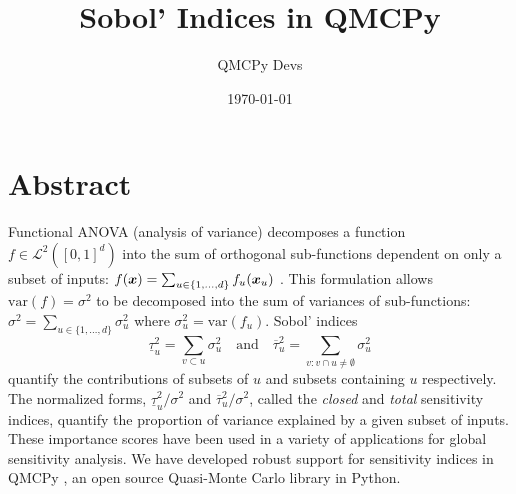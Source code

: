\documentclass{article}
\title{Sobol' Indices in QMCPy}
\author{QMCPy Devs}
\date{\today}
\begin{document}
\maketitle

\section{Abstract}
Functional ANOVA (analysis of variance) decomposes a function $f \in \mathcal{L}^2([0,1]^d)$ into the sum of orthogonal sub-functions dependent on only a subset of inputs: $f(\boldsymbol{x}) = \sum_{u \in \{1,\dots,d\}} f_u(\boldsymbol{x}_u)$ \cite[Appendix A]{mcbook}. This formulation allows $\text{var}(f)=\sigma^2$ to be decomposed into the sum of variances of sub-functions: 
$\sigma^2 = \sum_{u \in \{1,\dots,d\}} \sigma^2_u$ where $\sigma^2_u = \text{var}(f_u)$. Sobol' indices 
$$\underline{\tau}_u^2 = \sum_{v \subset u} \sigma^2_u \quad \text{and} \quad  \overline{\tau}_u^2 = \sum_{v: v \cap u \neq \emptyset} \sigma^2_u$$ quantify the contributions of subsets of $u$ and subsets containing $u$ respectively. The normalized forms, $\underline{\tau}_u^2/\sigma^2$ and  $\overline{\tau}_u^2/\sigma^2$, called the \emph{closed} and \emph{total} sensitivity indices, quantify the proportion of variance explained by a given subset of inputs. These importance scores have been used in a variety of applications for global sensitivity analysis. We have developed robust support for sensitivity indices in QMCPy \cite{QMCPy}, an open source Quasi-Monte Carlo library in Python. 

\printbibliography
\end{document}
